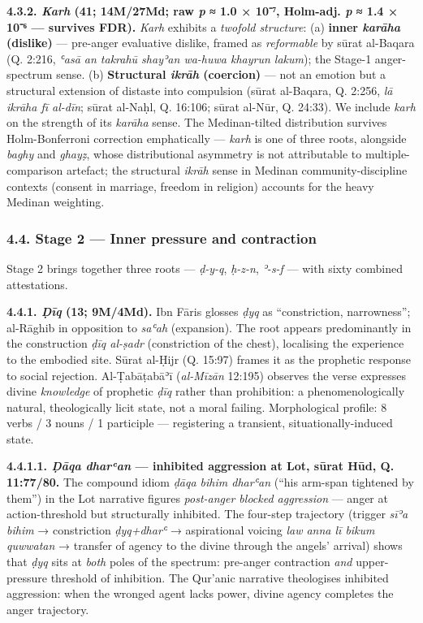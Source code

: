 \textbf{4.3.2. \emph{Karh} (41; 14M/27Md; raw \emph{p} ≈ 1.0 × 10⁻⁷,
Holm-adj. \emph{p} ≈ 1.4 × 10⁻⁶ --- survives FDR).} \emph{Karh} exhibits
a \emph{twofold structure}: (a) \textbf{inner \emph{karāha} (dislike)}
--- pre-anger evaluative dislike, framed as \emph{reformable} by sūrat
al-Baqara (Q. 2:216, \emph{ʿasā an takrahū shayʾan wa-huwa khayrun
lakum}); the Stage-1 anger-spectrum sense. (b) \textbf{Structural
\emph{ikrāh} (coercion)} --- not an emotion but a structural extension
of distaste into compulsion (sūrat al-Baqara, Q. 2:256, \emph{lā ikrāha
fī al-dīn}; sūrat al-Naḥl, Q. 16:106; sūrat al-Nūr, Q. 24:33). We
include \emph{karh} on the strength of its \emph{karāha} sense. The
Medinan-tilted distribution survives Holm-Bonferroni correction
emphatically --- \emph{karh} is one of three roots, alongside
\emph{baghy} and \emph{ghayẓ}, whose distributional asymmetry is not
attributable to multiple-comparison artefact; the structural
\emph{ikrāh} sense in Medinan community-discipline contexts (consent in
marriage, freedom in religion) accounts for the heavy Medinan weighting.

\subsubsection{4.4. Stage 2 --- Inner pressure and
contraction}\label{stage-2-inner-pressure-and-contraction}

Stage 2 brings together three roots --- \emph{ḍ-y-q}, \emph{ḥ-z-n},
\emph{ʾ-s-f} --- with sixty combined attestations.

\textbf{4.4.1. \emph{Ḍīq} (13; 9M/4Md).} Ibn Fāris glosses \emph{ḍyq} as
``constriction, narrowness''; al-Rāghib in opposition to \emph{saʿah}
(expansion). The root appears predominantly in the construction
\emph{ḍīq al-ṣadr} (constriction of the chest), localising the
experience to the embodied site. Sūrat al-Ḥijr (Q. 15:97) frames it as
the prophetic response to social rejection. Al-Ṭabāṭabāʾī
(\emph{al-Mīzān} 12:195) observes the verse expresses divine
\emph{knowledge} of prophetic \emph{ḍīq} rather than prohibition: a
phenomenologically natural, theologically licit state, not a moral
failing. Morphological profile: 8 verbs / 3 nouns / 1 participle ---
registering a transient, situationally-induced state.

\textbf{4.4.1.1. \emph{Ḍāqa dharʿan} --- inhibited aggression at Lot,
sūrat Hūd, Q. 11:77/80.} The compound idiom \emph{ḍāqa bihim dharʿan}
(``his arm-span tightened by them'') in the Lot narrative figures
\emph{post-anger blocked aggression} --- anger at action-threshold but
structurally inhibited. The four-step trajectory (trigger \emph{sīʾa
bihim} → constriction \emph{ḍyq+dharʿ} → aspirational voicing \emph{law
anna lī bikum quwwatan} → transfer of agency to the divine through the
angels' arrival) shows that \emph{ḍyq} sits at \emph{both} poles of the
spectrum: pre-anger contraction \emph{and} upper-pressure threshold of
inhibition. The Qur'anic narrative theologises inhibited aggression:
when the wronged agent lacks power, divine agency completes the anger
trajectory.

